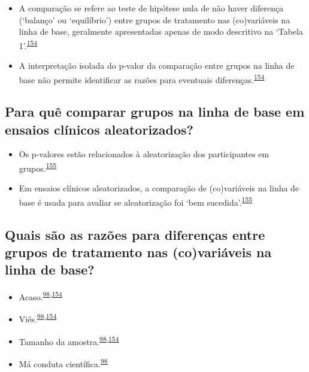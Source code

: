 \documentclass[
  a4paper,
]{book}
\begin{document}
\begin{itemize}
\item
  A comparação se refere ao teste de hipótese nula de não haver diferença (`balanço' ou `equilíbrio') entre grupos de tratamento nas (co)variáveis na linha de base, geralmente apresentadas apenas de modo descritivo na `Tabela 1'.\textsuperscript{\protect\hyperlink{ref-Stang2018}{154}}
\item
  A interpretação isolada do p-valor da comparação entre grupos na linha de base não permite identificar as razões para eventuais diferenças.\textsuperscript{\protect\hyperlink{ref-Stang2018}{154}}
\end{itemize}

\hypertarget{para-quuxea-comparar-grupos-na-linha-de-base-em-ensaios-cluxednicos-aleatorizados}{%
\subsection{Para quê comparar grupos na linha de base em ensaios clínicos aleatorizados?}\label{para-quuxea-comparar-grupos-na-linha-de-base-em-ensaios-cluxednicos-aleatorizados}}

\begin{itemize}
\item
  Os p-valores estão relacionados à aleatorização dos participantes em grupos.\textsuperscript{\protect\hyperlink{ref-Bolzern2019}{155}}
\item
  Em ensaios clínicos aleatorizados, a comparação de (co)variáveis na linha de base é usada para avaliar se aleatorização foi `bem sucedida'.\textsuperscript{\protect\hyperlink{ref-Bolzern2019}{155}}
\end{itemize}

\hypertarget{quais-suxe3o-as-razuxf5es-para-diferenuxe7as-entre-grupos-de-tratamento-nas-covariuxe1veis-na-linha-de-base}{%
\subsection{Quais são as razões para diferenças entre grupos de tratamento nas (co)variáveis na linha de base?}\label{quais-suxe3o-as-razuxf5es-para-diferenuxe7as-entre-grupos-de-tratamento-nas-covariuxe1veis-na-linha-de-base}}

\begin{itemize}
\item
  Acaso.\textsuperscript{\protect\hyperlink{ref-chen2020}{98},\protect\hyperlink{ref-Stang2018}{154}}
\item
  Viés.\textsuperscript{\protect\hyperlink{ref-chen2020}{98},\protect\hyperlink{ref-Stang2018}{154}}
\item
  Tamanho da amostra.\textsuperscript{\protect\hyperlink{ref-chen2020}{98},\protect\hyperlink{ref-Stang2018}{154}}
\item
  Má conduta científica.\textsuperscript{\protect\hyperlink{ref-chen2020}{98}}
\end{itemize}
\end{document}
